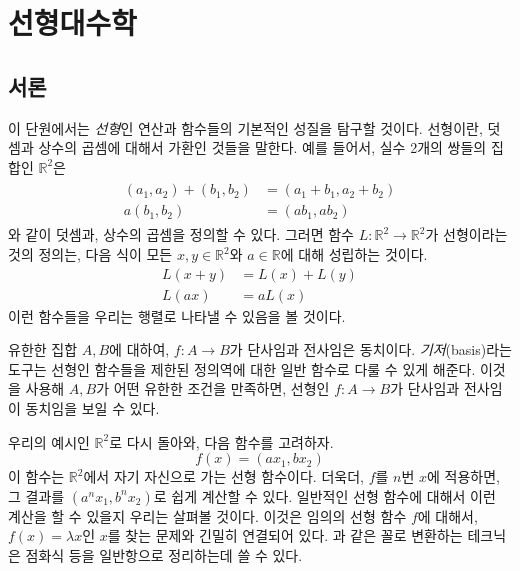

\chapter{선형대수학}
\label{chap:linalg}
\section{서론}
\label{sec:linalgint}
이 단원에서는 \textit{선형}인 연산과 함수들의 기본적인 성질을 탐구할 것이다.
선형이란, 덧셈과 상수의 곱셈에 대해서 가환인 것들을 말한다.
예를 들어서, 실수 2개의 쌍들의 집합인 $\mathbb{R}^2$은
\begin{align}
\begin{split}
\label{eq:linear1}
    (a_1, a_2) + (b_1, b_2) &= (a_1 + b_1, a_2 + b_2) \\
    a(b_1, b_2) &= (a b_1, a b_2)
\end{split}
\end{align}
와 같이 덧셈과, 상수의 곱셈을 정의할 수 있다.
그러면 함수 $L: \mathbb{R}^2 \to \mathbb{R}^2$가 선형이라는 것의 정의는, 다음 식이 모든 $x, y \in \mathbb{R}^2$와 $a \in \mathbb{R}$에 대해 성립하는 것이다.
\begin{align*}
    L(x + y) &= L(x) + L(y) \\
    L(ax) &= aL(x)
\end{align*}
이런 함수들을 우리는 행렬로 나타낼 수 있음을 볼 것이다.

유한한 집합 $A, B$에 대하여, $f: A \to B$가 단사임과 전사임은 동치이다.
\textit{기저}(basis)라는 도구는 선형인 함수들을 제한된 정의역에 대한 일반 함수로 다룰 수 있게 해준다.
이것을 사용해 $A, B$가 어떤 유한한 조건을 만족하면, 선형인 $f: A \to B$가 단사임과 전사임이 동치임을 보일 수 있다.

우리의 예시인 $\mathbb{R}^2$로 다시 돌아와, 다음 함수를 고려하자.
\begin{equation}
\label{eq:diag1}
    f(x) = (ax_1, bx_2)
\end{equation}
이 함수는 $\mathbb{R}^2$에서 자기 자신으로 가는 선형 함수이다.
더욱더, $f$를 $n$번 $x$에 적용하면, 그 결과를 $(a^n x_1, b^n x_2)$로 쉽게 계산할 수 있다.
일반적인 선형 함수에 대해서 이런 계산을 할 수 있을지 우리는 살펴볼 것이다.
이것은 임의의 선형 함수 $f$에 대해서, $f(x) = \lambda x$인 $x$를 찾는 문제와 긴밀히 연결되어 있다.
과 같은 꼴로 변환하는 테크닉은 점화식 등을 일반항으로 정리하는데 쓸 수 있다.


